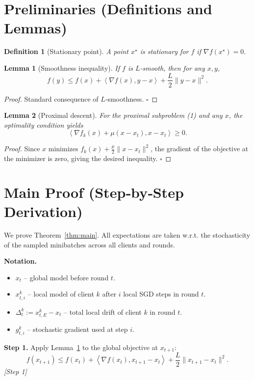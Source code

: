 \documentclass{article}
\newtheorem{lemma}{Lemma}
\newtheorem{definition}{Definition}
\newcommand{\inner}[2]{\left\langle #1,#2\right\rangle}
\begin{document}
\newpage
\section*{Preliminaries (Definitions and Lemmas)}
\begin{definition}[Stationary point]
A point $x^\star$ is stationary for $f$ if $\nabla f(x^\star)=0$.
\end{definition}

\begin{lemma}[Smoothness inequality]\label{lem:smooth}
If $f$ is $L$‑smooth, then for any $x,y$,
\[
f(y)\le f(x)+\inner{\nabla f(x)}{y-x}+\frac{L}{2}\|y-x\|^2.
\]
\end{lemma}
\begin{proof}
Standard consequence of $L$‑smoothness. \hfill $\square$
\end{proof}

\begin{lemma}[Proximal descent]\label{lem:prox}
For the proximal subproblem (1) and any $x$, the optimality condition yields
\[
\inner{ \nabla f_k(x) +\mu (x-x_t)}{x-x_t}\ge 0.
\]
\end{lemma}
\begin{proof}
Since $x$ minimizes $f_k(x)+\frac{\mu}{2}\|x-x_t\|^2$, the gradient of the objective at the minimizer is zero, giving the desired inequality. \hfill $\square$
\end{proof}

\section*{Main Proof (Step‑by‑Step Derivation)}
We prove Theorem~\ref{thm:main}.  All expectations are taken w.r.t. the stochasticity of the sampled minibatches across all clients and rounds.

\noindent\textbf{Notation.}
\begin{itemize}
\item $x_t$ – global model before round $t$.
\item $x_{t,i}^{k}$ – local model of client $k$ after $i$ local SGD steps in round $t$.
\item $\Delta_{t}^{k}:=x_{t,E}^{k}-x_t$ – total local drift of client $k$ in round $t$.
\item $g_{t,i}^{k}$ – stochastic gradient used at step $i$.
\end{itemize}

\noindent\textbf{Step 1.}  Apply Lemma~\ref{lem:smooth} to the global objective at $x_{t+1}$:
\[
f(x_{t+1})\le f(x_t)+\inner{\nabla f(x_t)}{x_{t+1}-x_t}
     +\frac{L}{2}\|x_{t+1}-x_t\|^2.
\tag{4}
\]
\textit{[Step 1]}
\end{document}
